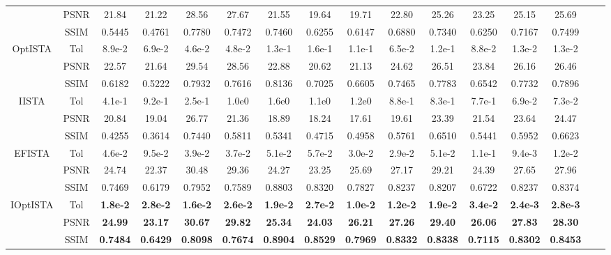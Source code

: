 \documentclass{article}
\begin{document}
\begin{table*}[thp]
\begin{center}
\begin{tabular}{c|c|c c | cc | cc| cc| cc| cc cc }
	  & PSNR & 21.84 & 21.22 & 28.56 & 27.67  & 21.55 & 19.64 & 19.71 & 22.80 & 25.26 & 23.25 & 25.15 & 25.69 \\ 
      & SSIM & 0.5445 & 0.4761 & 0.7780 & 0.7472  & 0.7460 & 0.6255 & 0.6147 & 0.6880 & 0.7340 & 0.6250 & 0.7167 & 0.7499  \\\hline
    \multirow{3}{*}{OptISTA} & Tol & 8.9e-2 & 6.9e-2 & 4.6e-2 & 4.8e-2  & 1.3e-1 & 1.6e-1 & 1.1e-1 & 6.5e-2 & 1.2e-1 & 8.8e-2 & 1.3e-2 & 1.3e-2   \\
	  & PSNR & 22.57 & 21.64 & 29.54 & 28.56  & 22.88 & 20.62 & 21.13 & 24.62 & 26.51 & 23.84 & 26.16 & 26.46 \\ 
      & SSIM & 0.6182 & 0.5222 & 0.7932 & 0.7616  & 0.8136 & 0.7025 & 0.6605 & 0.7465 & 0.7783 & 0.6542 & 0.7732 & 0.7896  \\\hline
\multirow{3}{*}{IISTA} & Tol & 4.1e-1 & 9.2e-1 & 2.5e-1 & 1.0e0  & 1.6e0 & 1.1e0 & 1.2e0 & 8.8e-1 & 8.3e-1 & 7.7e-1 & 6.9e-2 & 7.3e-2   \\
	  & PSNR & 20.84 & 19.04 & 26.77 & 21.36  & 18.89 & 18.24 & 17.61 & 19.61 & 23.39 & 21.54 & 23.64 & 24.47 \\ 
      & SSIM & 0.4255 & 0.3614 & 0.7440 & 0.5811  & 0.5341 & 0.4715 & 0.4958 & 0.5761 & 0.6510 & 0.5441 & 0.5952 & 0.6623  \\\hline
\multirow{3}{*}{EFISTA} & Tol & 4.6e-2 & 9.5e-2 & 3.9e-2 & 3.7e-2  & 5.1e-2 & 5.7e-2 & 3.0e-2 & 2.9e-2 & 5.1e-2 & 1.1e-1 & 9.4e-3 & 1.2e-2   \\
	  & PSNR & 24.74 & 22.37 & 30.48 & 29.36  & 24.27 & 23.25 & 25.69 & 27.17 & 29.21 & 24.39 & 27.65 & 27.96 \\ 
      & SSIM & 0.7469 & 0.6179 & 0.7952 & 0.7589  & 0.8803 & 0.8320 & 0.7827 & 0.8237 & 0.8207 & 0.6722 & 0.8237 & 0.8374  \\\hline
\multirow{3}{*}{IOptISTA} & Tol & \textbf{1.8e-2} & \textbf{2.8e-2} & \textbf{1.6e-2} & \textbf{2.6e-2} & \textbf{1.9e-2} & \textbf{2.7e-2} & \textbf{1.0e-2} & \textbf{1.2e-2} & \textbf{1.9e-2} & \textbf{3.4e-2} & \textbf{2.4e-3} & \textbf{2.8e-3}   \\
	  & PSNR & \textbf{24.99} & \textbf{23.17} & \textbf{30.67} & \textbf{29.82} & \textbf{25.34} & \textbf{24.03} & \textbf{26.21} & \textbf{27.26}  & \textbf{29.40} & \textbf{26.06} & \textbf{27.83} & \textbf{28.30} \\ 
      & SSIM & \textbf{0.7484} &\textbf{ 0.6429} & \textbf{0.8098} & \textbf{0.7674} & \textbf{0.8904} & \textbf{0.8529} & \textbf{0.7969} & \textbf{0.8332} & \textbf{0.8338} & \textbf{0.7115} & \textbf{0.8302} & \textbf{0.8453}  \\\hline
\end{tabular}
\end{center}
\end{table*}
\end{document}
